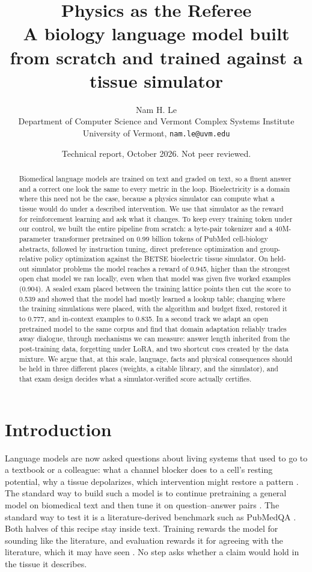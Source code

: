 \documentclass[11pt]{article}
\title{\textbf{Physics as the Referee}\\[3pt]
\large A biology language model built from scratch and trained against a tissue simulator}
\author{Nam H. Le\\[2pt]
\small Department of Computer Science and Vermont Complex Systems Institute\\
\small University of Vermont, \texttt{nam.le@uvm.edu}}
\date{\small Technical report, October 2026. Not peer reviewed.}
\begin{document}
\maketitle

\begin{abstract}
\noindent
Biomedical language models are trained on text and graded on text, so a
fluent answer and a correct one look the same to every metric in the loop.
Bioelectricity is a domain where this need not be the case, because a
physics simulator can compute what a tissue would do under a described
intervention. We use that simulator as the reward for reinforcement learning
and ask what it changes. To keep every training token under our control, we
built the entire pipeline from scratch: a byte-pair tokenizer and a
40M-parameter transformer pretrained on 0.99 billion tokens of PubMed
cell-biology abstracts, followed by instruction tuning, direct preference
optimization and group-relative policy optimization against the BETSE
bioelectric tissue simulator. On held-out simulator problems the model
reaches a reward of 0.945, higher than the strongest open chat model we ran
locally, even when that model was given five worked examples (0.904). A sealed exam
placed between the training lattice points then cut the score to 0.539 and
showed that the model had mostly learned a lookup table; changing where the
training simulations were placed, with the algorithm and budget fixed,
restored it to 0.777, and in-context examples to 0.835. In a second track we adapt
an open pretrained model to the same corpus and find that domain adaptation
reliably trades away dialogue, through mechanisms we can measure: answer length
inherited from the post-training data, forgetting under LoRA, and two
shortcut cues created by the data mixture. We argue that, at this scale,
language, facts and physical consequences should be held in three different
places (weights, a citable library, and the simulator), and that exam design
decides what a simulator-verified score actually certifies.
\end{abstract}

\section{Introduction}

Language models are now asked questions about living systems that used to
go to a textbook or a colleague: what a channel blocker does to a cell's
resting potential, why a tissue depolarizes, which intervention might
restore a pattern \citep{singhal2023large,wang2023scientific}. The standard
way to build such a model is to continue pretraining a general model on
biomedical text and then tune it on question--answer pairs
\citep{gururangan2020dont,luo2022biogpt,chen2023meditron,wu2024pmcllama}.
The standard way to test it is a literature-derived benchmark such as
PubMedQA \citep{jin2019pubmedqa}. Both halves of this recipe stay inside
text. Training rewards the model for sounding like the literature, and
evaluation rewards it for agreeing with the literature, which it may have
seen \citep{magar2022data,sainz2023nlp}. No step asks whether a claim would hold in
the tissue it describes.
\end{document}
